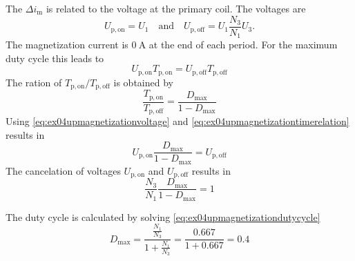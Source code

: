\begin{solutionblock}
    The $\Delta i_\mathrm{m}$ is related to the voltage at the primary coil. The voltages are
    \begin{equation}
        U_\mathrm{p,on}=U_\mathrm{1}  \quad \text{and} \quad U_\mathrm{p,off}=U_\mathrm{1}\frac{N_\mathrm{3}}{N_\mathrm{1}} U_\mathrm{3}.
        \label{eq:ex04upmagnetizationvoltage}
    \end{equation}     
    The magnetization current is $\SI{0}{\ampere}$ at the end of each period. For the maximum duty cycle this leads to
    \begin{equation}
        U_\mathrm{p,on}T_\mathrm{p,on}=U_\mathrm{p,off}T_\mathrm{p,off}
        \label{eq:ex04upmagnetizationtimerelation}        
    \end{equation} 
    The ration of $T_\mathrm{p,on}/T_\mathrm{p,off}$ is obtained by
    \begin{equation}
        \frac{T_\mathrm{p,on}}{T_\mathrm{p,off}}=\frac{D_\mathrm{max}}{1-D_\mathrm{max}}
    \end{equation} 
    Using \eqref{eq:ex04upmagnetizationvoltage} and \eqref{eq:ex04upmagnetizationtimerelation} results in
    \begin{equation}
        U_\mathrm{p,on} \frac{D_\mathrm{max}}{1-D_\mathrm{max}} = U_\mathrm{p,off}
        \label{eq:ex04upmagnetizationdutycycle}
    \end{equation}
    The cancelation of voltages $U_\mathrm{p,on}$ and $U_\mathrm{p,off}$ results in
    \begin{equation}
        \frac{N_\mathrm{3}}{N_\mathrm{1}} \frac{D_\mathrm{max}}{1-D_\mathrm{max}} = 1
        \label{eq:ex04upmagnetizationdutycycle}
    \end{equation} 

    The duty cycle is calculated by solving \eqref{eq:ex04upmagnetizationdutycycle}
    \begin{equation}
        D_\mathrm{max}=\frac{\frac{N_\mathrm{1}}{N_\mathrm{3}}}{1+\frac{N_\mathrm{1}}{N_\mathrm{3}}} 
        = \frac{0.667}{1+0.667}=0.4
        \label{eq:ex04upmagnetizationdutycycle}
    \end{equation}  
\end{solutionblock}

